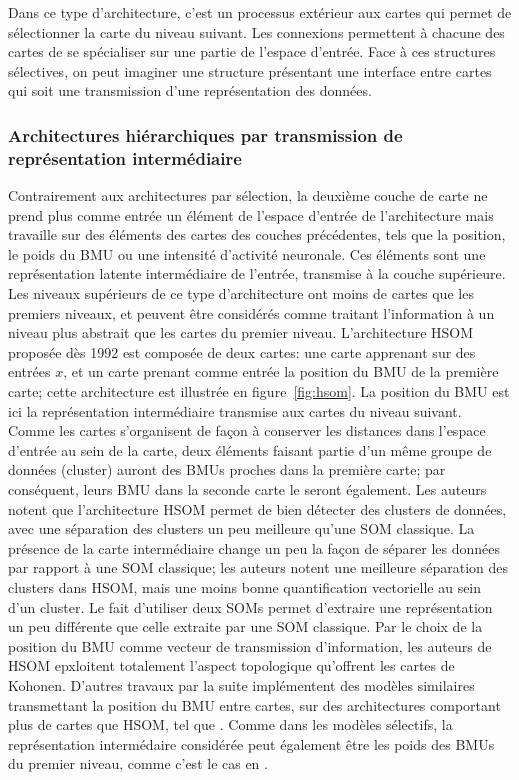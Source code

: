 \documentclass[../main]{subfiles}
\begin{document}
Dans ce type d'architecture, c'est un processus extérieur aux cartes qui permet de sélectionner la carte du niveau suivant. Les connexions permettent à chacune des cartes de se spécialiser sur une partie de l'espace d'entrée.
Face à ces structures sélectives, on peut imaginer une structure présentant une interface entre cartes qui soit une transmission d'une représentation des données.

\subsubsection{Architectures hiérarchiques par transmission de représentation intermédiaire}

Contrairement aux architectures par sélection, la deuxième couche de carte ne prend plus comme entrée un élément de l'espace d'entrée de l'architecture mais travaille sur des éléments des cartes des couches précédentes, tels que la position, le poids du BMU ou une intensité d'activité neuronale. 
Ces éléments sont une représentation latente intermédiaire de l'entrée, transmise à la couche supérieure. Les niveaux supérieurs de ce type d'architecture ont moins de cartes que les premiers niveaux, et peuvent être considérés comme traitant l'information à un niveau plus abstrait que les cartes du premier niveau.
L'architecture  HSOM \cite{lampinen_clustering_1992} proposée dès 1992 est composée de deux cartes: une carte apprenant sur des entrées $x$, et un carte prenant comme entrée la position du BMU de la première carte; cette architecture est illustrée en figure~\ref{fig:hsom}. La position du BMU est ici la représentation intermédiaire transmise aux cartes du niveau suivant.
Comme les cartes s'organisent de façon à conserver les distances dans l'espace d'entrée au sein de la carte, deux éléments faisant partie d'un même groupe de données (cluster) auront des BMUs proches dans la première carte; par conséquent, leurs BMU dans la seconde carte le seront également. 
Les auteurs notent que l'architecture HSOM permet de bien détecter des clusters de données, avec une séparation des clusters un peu meilleure qu'une SOM classique. La présence de la carte intermédiaire change un peu la façon de séparer les données par rapport à une SOM classique; les auteurs notent une meilleure séparation des clusters dans HSOM, mais une moins bonne quantification vectorielle au sein d'un cluster. Le fait d'utiliser deux SOMs permet d'extraire une représentation un peu différente que celle extraite par une SOM classique.
Par le choix de la position du BMU comme vecteur de transmission d'information, les auteurs de HSOM epxloitent totalement l'aspect topologique qu'offrent les cartes de Kohonen. D'autres travaux par la suite implémentent des modèles similaires transmettant la position du BMU entre cartes, sur des architectures comportant plus de cartes que HSOM, tel que \cite{hagenauer_hierarchical_2013}.
Comme dans les modèles sélectifs, la représentation intermédaire considérée peut également être les poids des BMUs du premier niveau, comme c'est le cas en \cite{wang_comparisonal_2007, gunes_kayacik_hierarchical_2007}.
\end{document}
